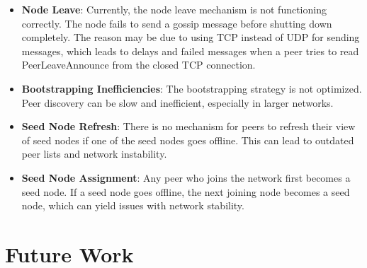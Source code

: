 \begin{itemize}
    \item \textbf{Node Leave}: Currently, the node leave mechanism is not functioning correctly. The node fails to send a gossip message before shutting down completely. The reason may be due to using TCP instead of UDP for sending messages, which leads to delays and failed messages when a peer tries to read PeerLeaveAnnounce from the closed TCP connection.
    
    \item \textbf{Bootstrapping Inefficiencies}: The bootstrapping strategy is not optimized. Peer discovery can be slow and inefficient, especially in larger networks.
    
    \item \textbf{Seed Node Refresh}: There is no mechanism for peers to refresh their view of seed nodes if one of the seed nodes goes offline. This can lead to outdated peer lists and network instability.
    
    \item \textbf{Seed Node Assignment}: Any peer who joins the network first becomes a seed node. If a seed node goes offline, the next joining node becomes a seed node, which can yield issues with network stability.
\end{itemize}

\section{Future Work}

